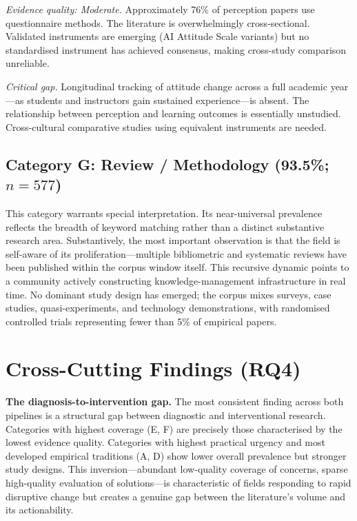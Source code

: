 \documentclass[conference]{IEEEtran}
\begin{document}
\textit{Evidence quality: Moderate.}
Approximately 76\% of perception papers use questionnaire methods. The literature is overwhelmingly
cross-sectional. Validated instruments are emerging (AI Attitude Scale variants) but no standardised
instrument has achieved consensus, making cross-study comparison unreliable.

\textit{Critical gap.}
Longitudinal tracking of attitude change across a full academic year---as students and instructors
gain sustained experience---is absent. The relationship between perception and learning outcomes is
essentially unstudied. Cross-cultural comparative studies using equivalent instruments are needed.

\subsection{Category G: Review / Methodology (93.5\%; $n = 577$)}

This category warrants special interpretation. Its near-universal prevalence reflects the breadth of
keyword matching rather than a distinct substantive research area. Substantively, the most important
observation is that the field is self-aware of its proliferation---multiple bibliometric and systematic
reviews have been published within the corpus window itself. This recursive dynamic points to a
community actively constructing knowledge-management infrastructure in real time. No dominant study
design has emerged; the corpus mixes surveys, case studies, quasi-experiments, and technology
demonstrations, with randomised controlled trials representing fewer than 5\% of empirical papers.

\section{Cross-Cutting Findings (RQ4)}
\label{sec:crosscut}

\textbf{The diagnosis-to-intervention gap.}
The most consistent finding across both pipelines is a structural gap between diagnostic and
interventional research. Categories with highest coverage (E, F) are precisely those characterised
by the lowest evidence quality. Categories with highest practical urgency and most developed empirical
traditions (A, D) show lower overall prevalence but stronger study designs. This inversion---abundant
low-quality coverage of concerns, sparse high-quality evaluation of solutions---is characteristic of
fields responding to rapid disruptive change but creates a genuine gap between the literature's volume
and its actionability.
\end{document}
